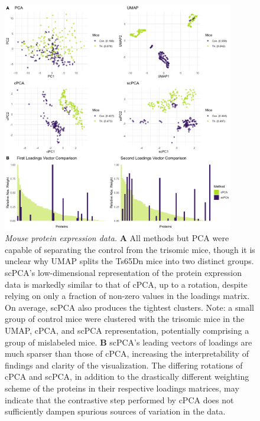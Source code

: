 \documentclass{article}
\begin{document}
\begin{figure}[!htbp]
  \centering
  \includegraphics[width=0.9\textwidth]{figures/mice_results}
  \caption{{\em Mouse protein expression data.} \textbf{A} All methods but PCA were capable of separating the control from the trisomic mice, though it is unclear why UMAP splits the Ts65Dn mice into two distinct groups. scPCA's low-dimensional representation of the protein expression data is markedly similar to that of cPCA, up to a rotation, despite relying on only a fraction of non-zero values in the loadings matrix. On average, scPCA also produces the tightest clusters. Note: a small group of control mice were clustered with the trisomic mice in the UMAP, cPCA, and scPCA representation, potentially comprising a group of mislabeled mice. \textbf{B} scPCA's leading vectors of loadings are much sparser than those of cPCA, increasing the interpretability of findings and clarity of the visualization. The differing rotations of cPCA and scPCA, in addition to the drastically different weighting scheme of the proteins in their respective loadings matrices, may indicate that the contrastive step performed by cPCA does not sufficiently dampen spurious sources of variation in the data.}
  \label{fig:comp_mice}
\end{figure}
\end{document}
